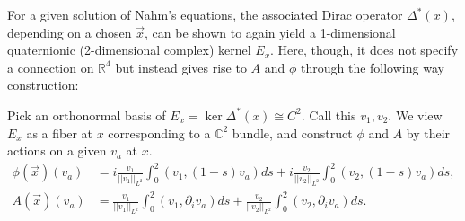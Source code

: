 	For a given solution of Nahm's equations, the associated Dirac operator $\Delta^*(x)$, depending on a chosen $\vec x$, can be shown to again yield a 1-dimensional quaternionic (2-dimensional complex) kernel $E_x$. Here, though, it does not specify a connection on $\mathbb R^4$ but instead gives rise to $A$ and $\phi$ through the following way construction:
	\begin{cons}
		Pick an orthonormal basis of $E_x = \ker \Delta^*(x) \cong C^2$. Call this $v_1, v_2$. We view $E_x$ as a fiber at $x$ corresponding to a $\mathbb C^2$ bundle, and construct $\phi$ and $A$ by their actions on a given $v_a$ at $x$.
		\begin{equation}
			\begin{aligned}
				\phi(\vec x)(v_a) &= i \frac{v_1}{||v_1||_{L^2}} \int_{0}^2 (v_1, (1-s) v_a) ds + i  \frac{v_2}{||v_2||_{L^2}} \int_0^2 (v_2, (1-s) v_a) ds,\\
				A(\vec x)(v_a) &= \frac{v_1}{||v_1||_{L^2}} \int_{0}^2 (v_1, \partial_i v_a) ds + \frac{v_2}{||v_2||_{L^2}} \int_0^2 (v_2, \partial_i v_a) ds.
			\end{aligned}
		\end{equation}
	\end{cons}


